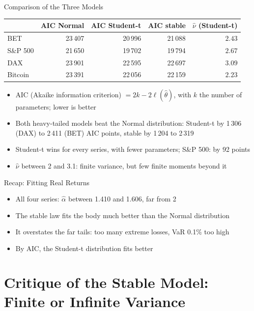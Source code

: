 \begin{frame}{Comparison of the Three Models}
\itemsize{\small}
\begin{center}
\footnotesize
\begin{tabular}{lrrrr}
\toprule
& AIC Normal & AIC Student-t & AIC stable & $\hat\nu$ (Student-t) \\
\midrule
BET & 23\,407 & 20\,996 & 21\,088 & $2.43$ \\
S\&P 500 & 21\,650 & 19\,702 & 19\,794 & $2.67$ \\
DAX & 23\,901 & 22\,595 & 22\,697 & $3.09$ \\
Bitcoin & 23\,391 & 22\,056 & 22\,159 & $2.23$ \\
\bottomrule
\end{tabular}
\end{center}
\begin{itemize}
    \item AIC (Akaike information criterion) $= 2k - 2\ell(\hat\theta)$, with $k$ the number of parameters; lower is better
    \item Both heavy-tailed models beat the Normal distribution: Student-t by 1\,306 (DAX) to 2\,411 (BET) AIC points, stable by 1\,204 to 2\,319
    \item Student-t wins for every series, with fewer parameters; S\&P 500: by 92 points
    \item $\hat\nu$ between 2 and 3.1: finite variance, but few finite moments beyond it
\end{itemize}
\end{frame}

\begin{frame}{Recap: Fitting Real Returns}
\itemsize{\small}
\begin{itemize}
    \item All four series: $\hat\alpha$ between 1.410 and 1.606, far from 2
    \item The stable law fits the body much better than the Normal distribution
    \item It overstates the far tails: too many extreme losses, VaR 0.1\% too high
    \item By AIC, the Student-t distribution fits better
\end{itemize}
\end{frame}


\section{Critique of the Stable Model: Finite or Infinite Variance}

